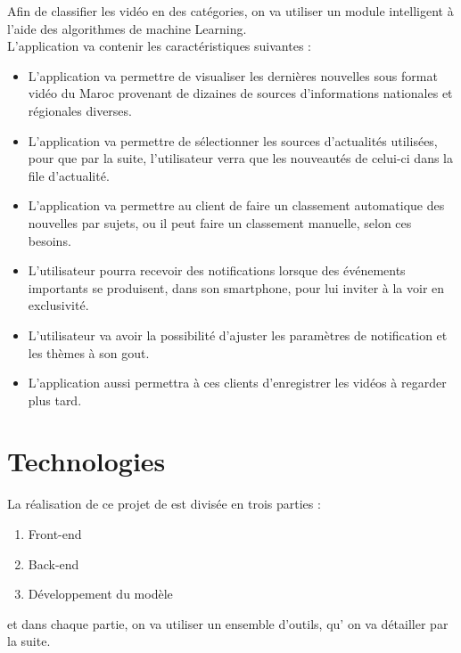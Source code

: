 Afin de classifier les vidéo en des catégories, on va utiliser un module intelligent à l'aide  des algorithmes de machine Learning.\\[0.5cm]
L'application va contenir les caractéristiques suivantes :
\begin{itemize}
\item L'application va permettre de visualiser les dernières nouvelles sous format vidéo du Maroc provenant de dizaines de sources d'informations nationales et régionales diverses.
\item L'application va permettre de sélectionner les sources d'actualités utilisées, pour que par la suite, l'utilisateur verra que les nouveautés de  celui-ci dans la file d'actualité.
\item L'application va permettre au client de faire  un classement automatique des nouvelles par sujets, ou il peut faire un classement manuelle, selon ces besoins.
\item L'utilisateur pourra recevoir des notifications lorsque des événements importants se produisent, dans son smartphone, pour lui inviter à la voir en exclusivité.
\item L'utilisateur va avoir la possibilité d'ajuster les paramètres de notification et les thèmes à son gout.
\item L'application aussi permettra à ces clients d'enregistrer les vidéos à regarder plus tard.
\end{itemize}


\section{Technologies}
La réalisation de ce projet de est divisée en trois parties :
\begin{enumerate}
 \item Front-end
 \item Back-end
 \item  Développement du modèle
 \end{enumerate} 
 et dans chaque partie, on va utiliser un ensemble d'outils, qu' on va détailler par la suite.
